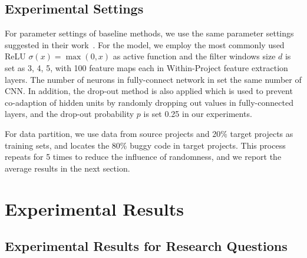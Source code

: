 \subsection{Experimental Settings}

For parameter settings of baseline methods, we use the same parameter settings suggested in their work~\cite{rao2011retrieval}. For the \TRANPCNN model, we employ the most commonly used ReLU $\sigma(x)=\max(0,x)$ as active function and the filter windows size $d$ is set as 3, 4, 5, with 100 feature maps each in Within-Project feature extraction layers. The number of neurons in fully-connect network in  set the same number of CNN. In addition, the drop-out method is also applied which is used to prevent co-adaption of hidden units by randomly dropping out values in fully-connected layers, and the drop-out probability $p$ is set 0.25 in our experiments.

For data partition, we use data from source projects and 20\% target projects as training sets, and locates the 80\% buggy code in target projects. This process repeats for 5 times to reduce the influence of randomness, and we report the average results in the next section.

\section{Experimental Results}

\subsection{Experimental Results for Research Questions}

